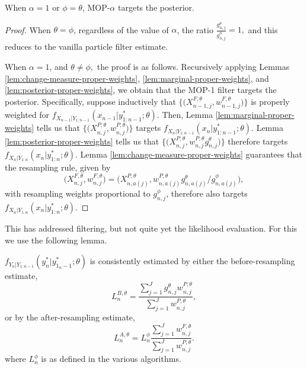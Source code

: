 \documentclass{article}
\begin{document}
\begin{prop}
    When $\alpha=1$ or $\phi=\theta$, MOP-$\alpha$ targets the posterior. 
\end{prop}
\begin{proof}
    When $\theta=\phi$, regardless of the value of $\alpha$, the ratio $\frac{g_{n,j}^\theta}{g_{n,j}^\phi}=1,$ and this reduces to the vanilla particle filter estimate.

    When $\alpha=1$, and $\theta\neq\phi,$ the proof is as follows. Recursively applying Lemmas \ref{lem:change-measure-proper-weights}, \ref{lem:marginal-proper-weights}, and \ref{lem:posterior-proper-weights}, we obtain that 
    the MOP-1 filter targets the posterior.
    Specifically, suppose inductively that $\big\{\big(X^{F,\theta}_{n-1,j},w^{F,\theta}_{n-1,j}\big)\big\}$ is properly weighted for $f_{X_{n-1}|Y_{1:n-1}}(x_{n-1}|y^*_{1:n-1};\theta)$.
    Then, Lemma \ref{lem:marginal-proper-weights} tells us that $\big\{\big(X^{P,\theta}_{n,j},w^{P,\theta}_{n,j}\big)\big\}$ targets $f_{X_{n}|Y_{1:n-1}}(x_{n}|y^*_{1:n-1};\theta)$.
    Lemma \ref{lem:posterior-proper-weights} tells us that $\big\{\big(X^{P,\theta}_{n,j},w^{P,\theta}_{n,j} g^\theta_{n,j} \big)\big\}$ therefore targets  $f_{X_{n}|Y_{1:n}}(x_{n}|y^*_{1:n};\theta)$.
    Lemma \ref{lem:change-measure-proper-weights} guarantees that the resampling rule, given by 
    \[
    \big(X^{F,\theta}_{n,j},w^{F,\theta}_{n,j}\big) = \big(X^{P,\theta}_{n,a(j)}, w^{P,\theta}_{n,a(j)} g^\theta_{n,a(j)}\big/ g^\phi_{n,a(j)}\big),
    \]
    with resampling weights proportional to $g^\phi_{n,j}$, therefore also targets $f_{X_{n}|Y_{1:n}}(x_{n}|y^*_{1:n};\theta)$.
\end{proof}


This has addressed filtering, but not quite yet the likelihood evaluation. For this we use the following lemma.

\begin{lem}
    \label{lem:lik-proper-weight}
  $f_{Y_n|Y_{1:n-1}}(y_n^*|y_{1_n-1}^*;\theta)$ is consistently estimated by either the before-resampling estimate,
\begin{equation}\label{L1}
L_n^{B,\theta} =  \frac{\sum_{j=1}^Jg^\theta_{n,j} w^{P,\theta}_{n,j}}{\sum_{j=1}^J  w^{P,\theta}_{n,j}},
\end{equation}
or by the after-resampling estimate,
\begin{equation}\label{L2}
L_n^{A,\theta} = L^\phi_n \frac{\sum_{j=1}^Jw^{F,\theta}_{n,j}}{\sum_{j=1}^J  w^{P,\theta}_{n,j}}.
\end{equation}
where $L^\phi_n$ is as defined in the various algorithms.
\end{lem}
\end{document}
